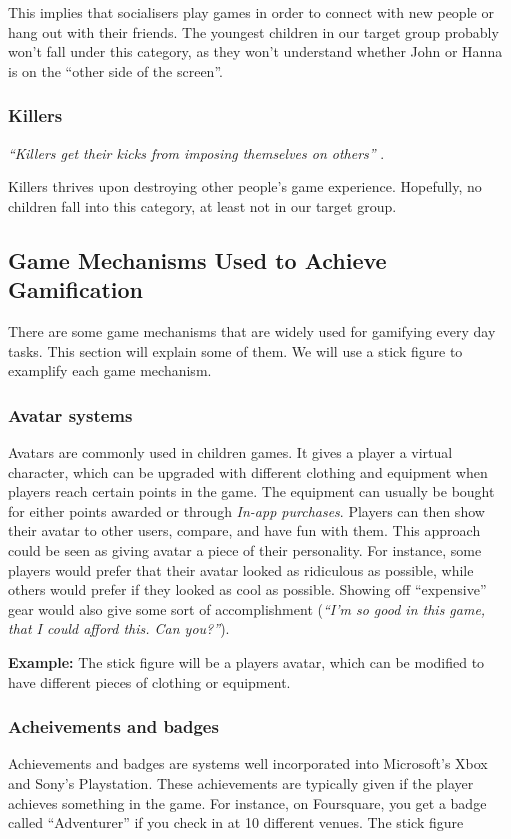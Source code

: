 This implies that socialisers play games in order to connect with new people or hang out with their friends. The youngest children in our target group probably won't fall under this category, as they won't understand whether John or Hanna is on the ``other side of the screen''.    

\subsubsection{Killers}
\textit{``Killers get their kicks from imposing themselves on others''} \cite{bartle-gamers}.

Killers thrives upon destroying other people's game experience. Hopefully, no children fall into this category, at least not in our target group.  

\subsection{Game Mechanisms Used to Achieve Gamification} 

There are some game mechanisms that are widely used for gamifying every day tasks. This section will explain some of them. We will use a stick figure to examplify each game mechanism. 

\subsubsection{Avatar systems}
Avatars are commonly used in children games. It gives a player a virtual character, which can be upgraded with different clothing and equipment when players reach certain points in the game. The equipment can usually be bought for either points awarded or through \emph{In-app purchases}. Players can then show their avatar to other users, compare, and have fun with them. This approach could be seen as giving avatar a piece of their personality. For instance, some players would prefer that their avatar looked as ridiculous as possible, while others would prefer if they looked as cool as possible. Showing off ``expensive'' gear would also give some sort of accomplishment (\emph{``I'm so good in this game, that I could afford this. Can you?''}). 

\textbf{Example:} The stick figure will be a players avatar, which can be modified to have different pieces of clothing or equipment.  

\subsubsection{Acheivements and badges}
Achievements and badges are systems well incorporated into Microsoft's Xbox and Sony's Playstation. These achievements are typically given if the player achieves something in the game. For instance, on Foursquare, you get a badge called ``Adventurer'' if you check in at 10 different venues. The stick figure

